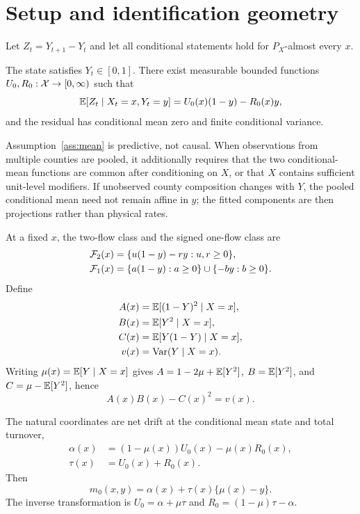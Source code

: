 \section{Setup and identification geometry}
\label{sec:setup}

Let $Z_t=Y_{t+1}-Y_t$ and let all conditional statements hold for $P_X$-almost every $x$.

\begin{assumption}
\label{ass:mean}
The state satisfies $Y_t\in[0,1]$. There exist measurable bounded functions $U_0,R_0:\mathcal{X}\to[0,\infty)$ such that
\begin{equation}
\mathbb{E}[Z_t\mid X_t=x,Y_t=y]=U_0(x)(1-y)-R_0(x)y,
\label{eq:mean_model}
\end{equation}
and the residual has conditional mean zero and finite conditional variance.
\end{assumption}

Assumption~\ref{ass:mean} is predictive, not causal. When observations from multiple counties are pooled, it additionally requires that the two conditional-mean functions are common after conditioning on $X$, or that $X$ contains sufficient unit-level modifiers. If unobserved county composition changes with $Y$, the pooled conditional mean need not remain affine in $y$; the fitted components are then projections rather than physical rates.

At a fixed $x$, the two-flow class and the signed one-flow class are
\begin{align}
\mathcal{F}_2(x)&=\{u(1-y)-ry:u,r\ge0\},\label{eq:f2}\\
\mathcal{F}_1(x)&=\{a(1-y):a\ge0\}\cup\{-by:b\ge0\}.\label{eq:f1}
\end{align}
Define
\begin{align}
A(x)&=\mathbb{E}[(1-Y)^2\mid X=x],\nonumber\\
B(x)&=\mathbb{E}[Y^2\mid X=x],\nonumber\\
C(x)&=\mathbb{E}[Y(1-Y)\mid X=x],\nonumber\\
v(x)&=\operatorname{Var}(Y\mid X=x).
\label{eq:moments}
\end{align}
Writing $\mu(x)=\mathbb{E}[Y\mid X=x]$ gives $A=1-2\mu+\mathbb{E}[Y^2]$, $B=\mathbb{E}[Y^2]$, and $C=\mu-\mathbb{E}[Y^2]$, hence
\begin{equation}
A(x)B(x)-C(x)^2=v(x).
\label{eq:moment_identity}
\end{equation}

The natural coordinates are net drift at the conditional mean state and total turnover,
\begin{align}
\alpha(x)&=(1-\mu(x))U_0(x)-\mu(x)R_0(x),\nonumber\\
\tau(x)&=U_0(x)+R_0(x).
\label{eq:alpha_tau}
\end{align}
Then
\begin{equation}
m_0(x,y)=\alpha(x)+\tau(x)\{\mu(x)-y\}.
\label{eq:orthogonal_mean}
\end{equation}
The inverse transformation is $U_0=\alpha+\mu\tau$ and $R_0=(1-\mu)\tau-\alpha$.

